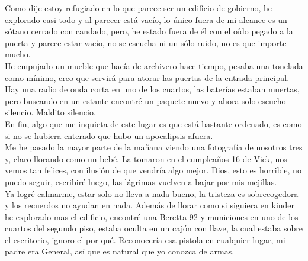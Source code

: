 Como dije estoy refugiado en lo que parece ser un edificio de gobierno, he explorado casi todo y al parecer está vacío, lo único fuera de mi alcance es un sótano cerrado con candado, pero, he estado fuera de él con el oído pegado a la puerta y parece estar vacío, no se escucha ni un sólo ruido, no es que importe mucho.\\ He empujado un mueble que hacía de archivero hace tiempo, pesaba una tonelada como mínimo, creo que servirá para atorar las puertas de la entrada principal.
Hay una radio de onda corta en uno de los cuartos, las baterías estaban muertas, pero buscando en un estante encontré un paquete nuevo y ahora solo escucho silencio. Maldito silencio.\\
En fin, algo que me inquieta de este lugar es que está bastante ordenado, es como si no se hubiera enterado que hubo un apocalipsis afuera.\\
Me he pasado la mayor parte de la mañana viendo una fotografía de nosotros tres y, claro llorando como un bebé. La tomaron en el cumpleaños 16 de Vick, nos vemos tan felices, con ilusión de que vendría algo mejor. Dios, esto es horrible, no puedo seguir, escribiré luego, las lágrimas vuelven a bajar por mis mejillas.\\[4cm]
Ya logré calmarme, estar solo no lleva a nada bueno, la tristeza es sobrecogedora y los recuerdos no ayudan en nada. Además de llorar como si siguiera en kinder he explorado mas el edificio, encontré una Beretta 92 y municiones en uno de los cuartos del segundo piso, estaba oculta en un cajón con llave, la cual estaba sobre el escritorio, ignoro el por qué. Reconocería esa pistola en cualquier lugar, mi padre era General, así que es natural que yo conozca de armas.

